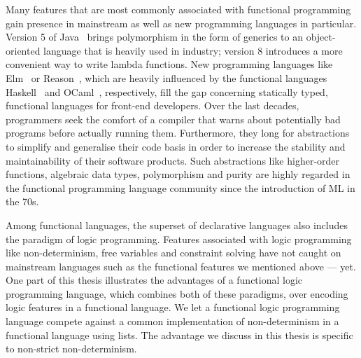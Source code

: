 %


Many features that are most commonly associated with functional programming gain presence in mainstream as well as new programming languages in particular.
Version 5 of Java~\citep{arnold2005java} brings polymorphism in the form of generics to an object-oriented language that is heavily used in industry; version 8 introduces a more convenient way to write lambda functions.
New programming languages like Elm~\citep{czaplicki2012elm} or Reason~\citep{2019reasonml}, which are heavily influenced by the functional languages Haskell~\citep{jones2002haskell} and OCaml~\citep{minsky2013real}, respectively, fill the gap concerning statically typed, functional languages for front-end developers.
Over the last decades, programmers seek the comfort of a compiler that warns about potentially bad programs before actually running them.
Furthermore, they long for abstractions to simplify and generalise their code basis in order to increase the stability and maintainability of their software products.
Such abstractions like higher-order functions, algebraic data types, polymorphism and purity are highly regarded in the functional programming language community since the introduction of ML in the 70s.

Among functional languages, the superset of declarative languages also includes the paradigm of logic programming.
Features associated with logic programming like non-determinism, free variables and constraint solving have not caught on mainstream languages such as the functional features we mentioned above --- yet.
One part of this thesis illustrates the advantages of a functional logic programming language, which combines both of these paradigms, over encoding logic features in a functional language.
We let a functional logic programming language compete against a common implementation of non-determinism in a functional language using lists.
The advantage we discuss in this thesis is specific to non-strict non-determinism.


